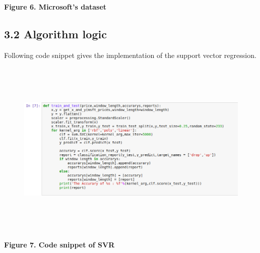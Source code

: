 \documentclass[12pt]{article}
\begin{document}

\par

\begin{Center}
\textbf{Figure 6. Microsoft’s dataset}
\end{Center}\par

\subsection*{3.2 Algorithm logic}

\vspace{\baselineskip}
Following code snippet gives the implementation of the support vector regression.\par


\vspace{\baselineskip}



\begin{figure}[H]
	\begin{Center}
		\includegraphics[width=6.97in,height=3.38in]{./media/image8.png}
	\end{Center}
\end{figure}



\par

\begin{Center}
\textbf{Figure 7. Code snippet of SVR} 
\end{Center}\par
\end{document}
